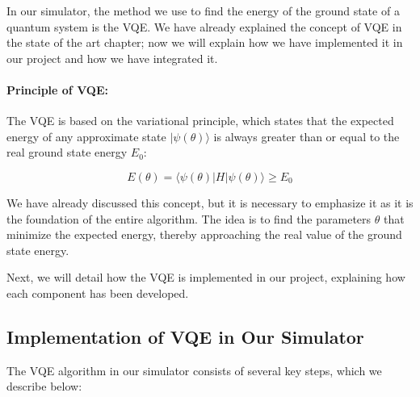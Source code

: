 In our simulator, the method we use to find the energy of the ground state of a quantum system is the VQE. We have already explained the concept of VQE in the state of the art chapter; now we will explain how we have implemented it in our project and how we have integrated it.

\paragraph{Principle of VQE:}

The VQE is based on the variational principle, which states that the expected energy of any approximate state \( |\psi(\theta)\rangle \) is always greater than or equal to the real ground state energy \( E_0 \):

\[
E(\theta) = \langle \psi(\theta) | H | \psi(\theta) \rangle \geq E_0
\]

We have already discussed this concept, but it is necessary to emphasize it as it is the foundation of the entire algorithm. The idea is to find the parameters \( \theta \) that minimize the expected energy, thereby approaching the real value of the ground state energy.

\bigskip

Next, we will detail how the VQE is implemented in our project, explaining how each component has been developed.

\subsection{Implementation of VQE in Our Simulator}

The VQE algorithm in our simulator consists of several key steps, which we describe below:

